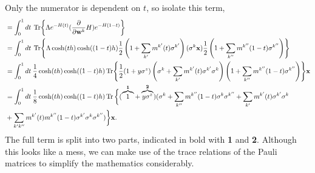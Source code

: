 Only the numerator is dependent on $t$, so isolate this term,
\begin{align*}
    &= \int_{0}^1 dt\: \Tr{\Lambda e^{-H(t)} (\frac{\partial }{\partial \mathbf{w}^k} H)e^{-H(1-t)}}\\
    &= \int_{0}^1 dt\: \Tr{\Lambda \cosh(th)\cosh((1-t)h) \frac{1}{2}\left(1 + \sum_{k^{\prime}} m^{k^{\prime}}(t) \sigma^{k^{\prime}} \right) (\sigma^k \mathbf{x}) \frac{1}{2} \left(1 + \sum_{k^{\prime\prime}} m^{k^{\prime\prime}}(1-t) \sigma^{k^{\prime\prime}}\right)}\\
    &= \int_{0}^1 dt\: \frac{1}{4} \cosh(th)\cosh((1-t)h) \Tr{\frac{1}{2}(1+ y \sigma^z)  \left(\sigma^k + \sum_{k^{\prime}} m^{k^{\prime}}(t) \sigma^{k^{\prime}} \sigma^k\right)  \left(1 + \sum_{k^{\prime\prime}} m^{k^{\prime\prime}}(1-t) \sigma^{k^{\prime\prime}}\right)}\mathbf{x}\\
    &= \int_{0}^1 dt\: \frac{1}{8} \cosh(th)\cosh((1-t)h) \Tr\bigg\{(\overbrace{1}^{\textbf{1}} + \overbrace{y \sigma^z}^{\textbf{2}}) ( \sigma^k + 
    \sum_{k^{\prime\prime}} m^{k^{\prime\prime}}(1-t) \sigma^k\sigma^{k^{\prime\prime}} +
    \sum_{k^{\prime}} m^{k^{\prime}}(t) \sigma^{k^{\prime}} \sigma^k  \\
    & + \sum_{k^{\prime}k^{\prime\prime}} m^{k^{\prime}}(t) m^{k^{\prime\prime}}(1-t)\sigma^{k^{\prime}} \sigma^k\sigma^{k^{\prime\prime}})\bigg\}\mathbf{x}.
\end{align*}
The full term is split into two parts, indicated in bold with \textbf{1}  and \textbf{2}. Although this looks like a mess, we can make use of the trace relations of the Pauli matrices to simplify the mathematics considerably.

